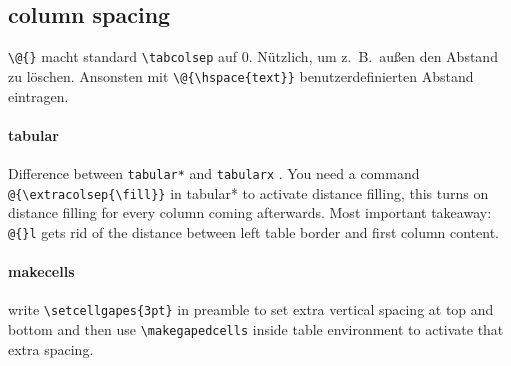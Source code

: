 \subsection{column spacing}
\verb|\@{}| macht standard \verb|\tabcolsep| auf 0. Nützlich, um z.\ B.\ außen den Abstand zu löschen. Ansonsten mit \verb|\@{\hspace{text}}| benutzerdefinierten Abstand eintragen. 

\paragraph{tabular\*} Difference between \verb|tabular*| and \verb|tabularx| . You need a command \verb|@{\extracolsep{\fill}}| in tabular* to activate distance filling, this turns on distance filling for every column coming afterwards. Most important takeaway: \verb|@{}l| gets rid of the distance between left table border and first column content. 

\paragraph{makecells}
write \verb|\setcellgapes{3pt}| in preamble to set extra vertical spacing at top and bottom and then use \verb|\makegapedcells| inside table environment to activate that extra spacing.

